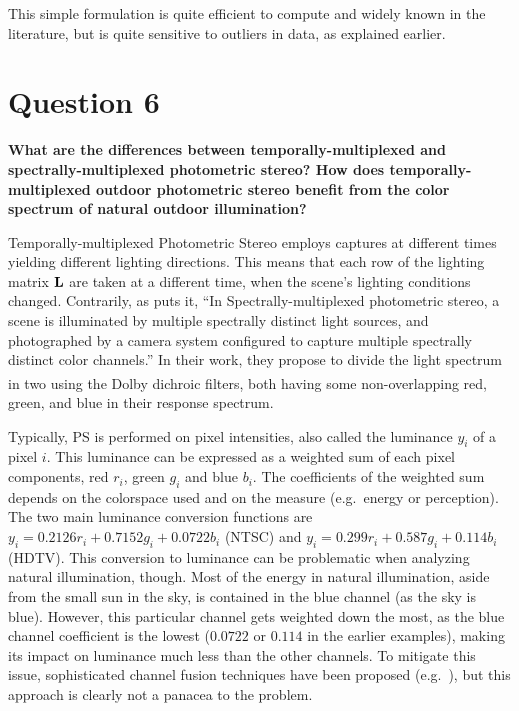 \documentclass{report}
\begin{document}
This simple formulation is quite efficient to compute and widely known in the literature, but is quite sensitive to outliers in data, as explained earlier.

\section{Question 6}
\textbf{What are the differences between temporally-multiplexed and spectrally-multiplexed photometric stereo? How does temporally-multiplexed outdoor photometric stereo benefit from the color spectrum of natural outdoor illumination?}

Temporally-multiplexed Photometric Stereo employs captures at different times yielding different lighting directions. This means that each row of the lighting matrix $\mathbf{L}$ are taken at a different time, when the scene's lighting conditions changed. Contrarily, as \cite{Fyffe2011} puts it, ``In Spectrally-multiplexed photometric stereo, a scene is illuminated by multiple spectrally distinct light sources, and photographed by a camera system configured to capture multiple spectrally distinct color channels.'' In their work, they propose to divide the light spectrum in two using the Dolby\textsuperscript{\textregistered} dichroic filters, both having some non-overlapping red, green, and blue in their response spectrum.

Typically, PS is performed on pixel intensities, also called the luminance $y_i$ of a pixel $i$. This luminance can be expressed as a weighted sum of each pixel components, red $r_i$, green $g_i$ and blue $b_i$. The coefficients of the weighted sum depends on the colorspace used and on the measure (e.g.\ energy or perception). The two main luminance conversion functions are $y_i = 0.2126r_i + 0.7152g_i + 0.0722b_i$ (NTSC) and $y_i = 0.299r_i + 0.587g_i + 0.114b_i$ (HDTV). This conversion to luminance can be problematic when analyzing natural illumination, though. Most of the energy in natural illumination, aside from the small sun in the sky, is contained in the blue channel (as the sky is blue). However, this particular channel gets weighted down the most, as the blue channel coefficient is the lowest ($0.0722$ or $0.114$ in the earlier examples), making its impact on luminance much less than the other channels. To mitigate this issue, sophisticated channel fusion techniques have been proposed (e.g.\ \cite{jung-cvpr-15}), but this approach is clearly not a panacea to the problem.
\end{document}
